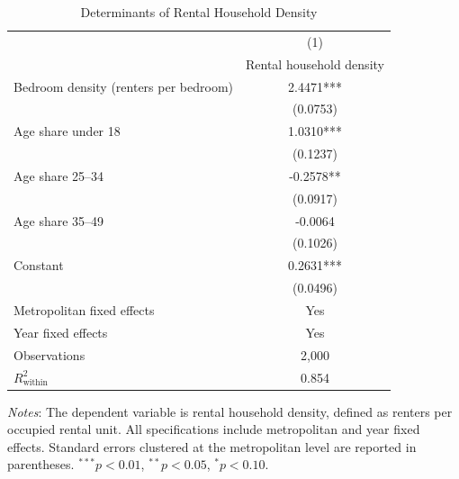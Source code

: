 \begin{table}[htbp]
\centering
\caption{Determinants of Rental Household Density}
\label{tab:panelols_density}
\begin{tabular}{lc}
\toprule
 & (1) \\
 & Rental household density \\
\midrule
Bedroom density (renters per bedroom) & 2.4471*** \\
                                     & (0.0753)  \\
Age share under 18                    & 1.0310*** \\
                                     & (0.1237)  \\
Age share 25--34                      & -0.2578** \\
                                     & (0.0917)  \\
Age share 35--49                      & -0.0064   \\
                                     & (0.1026)  \\
Constant                              & 0.2631*** \\
                                     & (0.0496)  \\
\midrule
Metropolitan fixed effects            & Yes \\
Year fixed effects                    & Yes \\
Observations                          & 2,000 \\
$R^2_{\text{within}}$                 & 0.854 \\
\bottomrule
\end{tabular}
\begin{flushleft}
\footnotesize
\textit{Notes}: The dependent variable is rental household density, defined as renters
per occupied rental unit. All specifications include metropolitan and year fixed effects.
Standard errors clustered at the metropolitan level are reported in parentheses.
$^{***}p<0.01$, $^{**}p<0.05$, $^{*}p<0.10$.
\end{flushleft}
\end{table}
